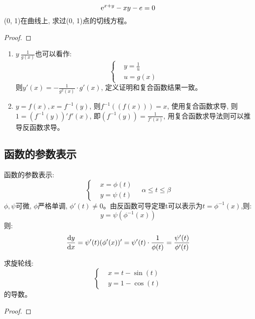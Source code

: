 \begin{example}
    \[ \mathrm{e}^{x+y} - xy - e = 0\]
    (0, 1)在曲线上, 求过(0, 1)点的切线方程。
\end{example}
\begin{proof}
    
\end{proof}

\begin{remark}
    \begin{enumerate}
        \item $y \ \frac{1}{g(x)}$也可以看作:
        \begin{equation*}
            \left\{ 
                \begin{aligned}
                    &y = \frac{1}{u} \\
                    &u = g(x)
                \end{aligned}
            \right.
        \end{equation*}
        则$y'(x) = -\frac{1}{g^2(x)}\cdot g'(x)$, 定义证明和复合函数结果一致。
        \item $y = f(x), x = f^{-1}(y)$, 则$f^{-1}((f(x))) = x$, 使用复合函数求导, 则$1 = (f^{-1}(y))'f'(x)$, 即$(f^{-1}(y)) = \frac{1}{f'(x)}$, 用复合函数求导法则可以推导反函数求导。
    \end{enumerate}
\end{remark}

\subsection{函数的参数表示}
函数的参数表示:
\begin{equation*}
    \left\{ 
        \begin{aligned}
            &x = \phi(t) \\
            &y = \psi(t)
        \end{aligned}
    \right.
    \quad \alpha \le t \le \beta
\end{equation*}
$\phi, \psi$可微, $\phi$严格单调, $\phi '(t) \neq 0$。由反函数可导定理t可以表示为$t = \phi^{-1}(x)$,则:
\begin{equation*}
    y = \psi(\phi^{-1}(x))
\end{equation*}
则:
\begin{equation*}
    \frac{\mathrm{d} y}{\mathrm{d} x} = \psi'(t)(\phi'(x))' = \psi'(t)\cdot \frac{1}{\phi(t)} = \frac{\psi'(t)}{\phi'(t)}
\end{equation*}

\begin{example}
    求旋轮线:
    \begin{equation*}
        \left\{ 
            \begin{aligned}
                &x = t - \sin(t) \\
                &y = 1 - \cos(t)
            \end{aligned}
        \right.
    \end{equation*}
    的导数。
\end{example}
\begin{proof}
    
\end{proof}

